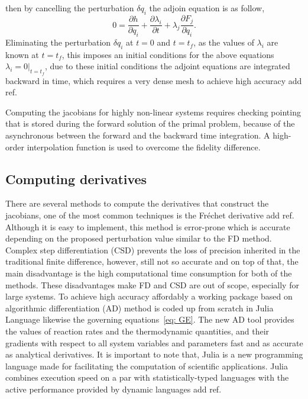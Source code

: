 \documentclass[preprint,review,12pt]{elsarticle}
\begin{document}
then by cancelling the perturbation $\delta q_i$ the adjoin equation is as follow,
\begin{equation}
0=\frac{\partial h}{\partial q_i}+\frac{\partial \lambda_i}{\partial t}+\lambda_j \frac{\partial F_j}{\partial q_i}.
\end{equation}
Eliminating the perturbation $\delta q_i$ at $t=0$ and $
t=t_f$, as the values of $\lambda_i$ are known at $t=t_f$, this imposes an initial conditions for the above equations $\lambda_i=0\Big|_{t=t_f}$, due to these initial conditions the adjoint equations are integrated backward in time, which requires a very dense mesh to achieve high accuracy {\color{red} add ref}.



Computing the jacobians for highly non-linear systems requires checking pointing that is stored during the forward solution of the primal problem, because of the asynchronous between the forward and the backward time integration. A high-order interpolation function is used to overcome the fidelity difference. 
\subsection{Computing derivatives}

There are several methods to compute the derivatives that construct the jacobians, one of the most common techniques is the Fréchet derivative {\color{red} add ref}. Although it is easy to implement, this method is error-prone which is accurate depending on the proposed perturbation value similar to the FD method. Complex step differentiation (CSD) prevents the loss of precision inherited in the traditional finite difference, however, still not so accurate and on top of that, the main disadvantage is the high computational time consumption for both of the methods. These disadvantages make FD and CSD are out of scope, especially for large systems. To achieve high accuracy affordably a working package based on algorithmic differentiation (AD) method is coded up from scratch in Julia Language likewise the governing equations~\ref{eq: GE}. The new AD tool provides the values of reaction rates and the thermodynamic quantities, and their gradients with respect to all system variables and parameters%
fast and as accurate as analytical derivatives. It is important to note that, Julia is a new programming language made for facilitating the computation of scientific applications. Julia combines execution speed on a par with statistically-typed languages with the active performance provided by dynamic languages  {\color{red} add ref}.
      
\end{document}
